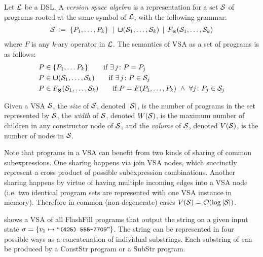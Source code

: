 \begin{defn}
    \label{def:vsa}
    Let $\mathcal{L}$ be a DSL.
    A \emph{version space algebra} is a representation for a set $\mathcal{S}$ of programs rooted at the same symbol of $\mathcal{L}$,
    with the following grammar:
    \begin{align*}
        \mathcal{S} \;\coloneq\; \left\{P_1, \dots, P_k\right\} \,\;|\;\, \bm{\mathsf{\cup}}(\mathcal{S}_1, \dots, \mathcal{S}_k) \,\;|\;\, F_{\text{\scriptsize\ensuremath{\Join}}}(\mathcal{S}_1, \dots, \mathcal{S}_k)
    \end{align*}
    where $F$ is any $k$-ary operator in $\mathcal{L}$.
    The semantics of VSA as a set of programs is as follows:
    \begin{align*}
        &P \in \left\{P_1, \dots P_k\right\} \tag*{if $\exists\, j\colon P = P_j$} \\
        &P \in \vsaunion(\vsa_1, \dots, \vsa_k) \tag*{if $\exists\, j\colon P \in \vsa_j$} \\
        &P \in \joinCons(\vsa_1, \dotsc, \vsa_k) \tag*{if $P = F(P_1, \dots, P_k) \ \wedge\ \forall j\colon P_j \in \vsa_j$}
    \end{align*}
\end{defn}

\begin{defn}
    Given a VSA $\mathcal{S}$, the \emph{size} of $\mathcal{S}$, denoted $|\mathcal{S}|$, is the number of programs in the set
    represented by $\mathcal{S}$, the \emph{width} of $\mathcal{S}$, denoted $W(\mathcal{S})$, is the maximum number of children
    in any constructor node of $\mathcal{S}$, and the \emph{volume} of $\mathcal{S}$, denoted $V(\mathcal{S})$, is the number of nodes in $\mathcal{S}$.
\end{defn}

Note that programs in a VSA can benefit from two kinds of sharing of common subexpressions.
One sharing happens via join VSA nodes, which succinctly represent a cross product of possible subexpression
combinations.
Another sharing happens by virtue of having multiple incoming edges into a VSA node (i.e. two identical program sets are
represented with one VSA instance in memory).
Therefore in common (non-degenerate) cases $V(\mathcal{S}) = \mathcal{O}(\log |\mathcal{S}|)$.

\begin{example}
     shows a VSA of all FlashFill programs that output the string  on a given input state
    $\state = \left\{ v_1 \mapsto \stringliteral{(425) 555-7709}\right\}$.
    The string  can be represented in four possible ways as a concatenation of individual substrings.
    Each substring of  can be produced by a \textsf{ConstStr} program or a \textsf{SubStr} program.
\end{example}

